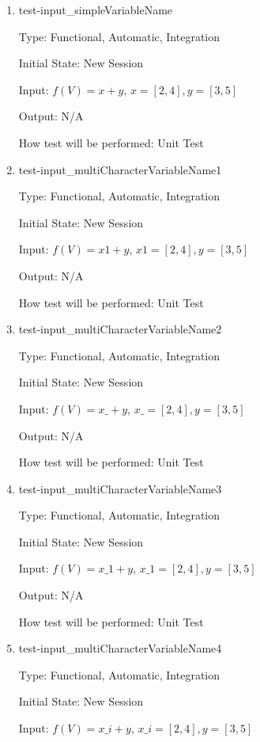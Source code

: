 \documentclass[12pt, titlepage]{article}
\begin{document}
\begin{enumerate}
	
	\item{test-input\_simpleVariableName}
	
	Type: Functional, Automatic, Integration
	
	Initial State: New Session
	
	Input: $f(V) = x + y$, $x = [2,4], y = [3,5]$
	
	Output: N/A
	
	How test will be performed: Unit Test\\
	
	\item{test-input\_multiCharacterVariableName1}
	
	Type: Functional, Automatic, Integration
	
	Initial State: New Session
	
	Input: $f(V) = x1 + y$, $x1 = [2,4], y = [3,5]$
	
	Output: N/A
	
	How test will be performed: Unit Test\\
	
	\item{test-input\_multiCharacterVariableName2}
	
	Type: Functional, Automatic, Integration
	
	Initial State: New Session
	
	Input: $f(V) = x\_ + y$, $x\_ = [2,4], y = [3,5]$
	
	Output: N/A
	
	How test will be performed: Unit Test\\
	
	\item{test-input\_multiCharacterVariableName3}
	
	Type: Functional, Automatic, Integration
	
	Initial State: New Session
	
	Input: $f(V) = x\_1 + y$, $x\_1 = [2,4], y = [3,5]$
	
	Output: N/A
	
	How test will be performed: Unit Test\\
	
	\item{test-input\_multiCharacterVariableName4}
	
	Type: Functional, Automatic, Integration
	
	Initial State: New Session
	
	Input: $f(V) = x\_i + y$, $x\_i = [2,4], y = [3,5]$
	

\end{enumerate}
\end{document}
